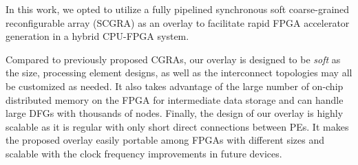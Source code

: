 In this work, we opted to utilize a fully pipelined synchronous soft coarse-grained reconfigurable array (SCGRA) as an overlay to facilitate rapid FPGA accelerator generation in a hybrid CPU-FPGA system.

Compared to previously proposed CGRAs, our overlay is designed to be \emph{soft} as the size, processing element designs, as well as the interconnect topologies may all be customized as needed.
It also takes advantage of the large number of on-chip distributed memory on the FPGA for intermediate data storage and can handle large DFGs with thousands of nodes.
Finally, the design of our overlay is highly scalable as it is regular with only short direct connections between PEs.
It makes the proposed overlay easily portable among FPGAs with different sizes and scalable with the clock frequency improvements in future devices.









